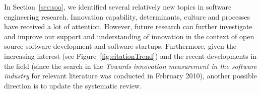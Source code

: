 \documentclass[sigconf,review]{acmart}
\newcommand{\theArticle}{\textit{Towards innovation measurement in the software industry}}
\begin{document}
In Section~\ref{sec:soa}, we identified several relatively new topics in software engineering research. Innovation capability, determinants, culture and processes have received a lot of attention. However, future research can further investigate and improve our support and understanding of innovation in the context of open source software development and software startups. Furthermore, given the increasing interest (see Figure~\ref{fig:citationTrend}) and the recent developments in the field (since the search in the \theArticle{} for relevant literature was conducted in February 2010), another possible direction is to update the systematic review. 
 









\end{document}
